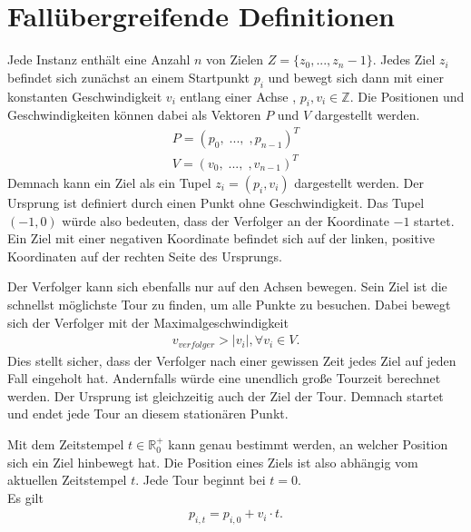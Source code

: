\documentclass[german,version-2019-11]{uzl-thesis}
\begin{document}
\section{Fallübergreifende Definitionen}
\begin{definition} 
\label{def:Ziel}
Jede Instanz enthält eine Anzahl $n$ von Zielen $Z = \{z_0,...,z_n-1\}$. Jedes Ziel $z_i$ befindet sich zunächst an einem Startpunkt $p_i$ und bewegt sich dann mit einer konstanten Geschwindigkeit $v_i$ entlang einer Achse , $p_i, v_i \in\mathbb{Z}$. Die Positionen und Geschwindigkeiten können dabei als Vektoren $P$ und $V$ dargestellt werden.
\begin{align*}
P = (p_0, \; ..., \; ,p_{n-1})^T \\
V = (v_0, \; ..., \; ,v_{n-1})^T
\end{align*}
Demnach kann ein Ziel als ein Tupel $z_i = (p_i, v_i)$ dargestellt werden. Der Ursprung ist definiert durch einen Punkt ohne Geschwindigkeit. Das Tupel $(-1,0)$ würde also bedeuten, dass der Verfolger an der Koordinate $-1$ startet. Ein Ziel mit einer negativen Koordinate befindet sich auf der linken, positive Koordinaten auf der rechten Seite des Ursprungs. 
\end{definition}

\begin{definition}
Der Verfolger kann sich ebenfalls nur auf den Achsen bewegen. Sein Ziel ist die schnellst möglichste Tour zu finden, um alle Punkte zu besuchen. Dabei bewegt sich der Verfolger mit der Maximalgeschwindigkeit 
\begin{align*}
v_{verfolger} > |v_i|, \forall v_i\in V.
\end{align*}
Dies stellt sicher, dass der Verfolger nach einer gewissen Zeit jedes Ziel auf jeden Fall eingeholt hat. Andernfalls würde eine unendlich große Tourzeit berechnet werden. Der Ursprung ist gleichzeitig auch der Ziel der Tour. Demnach startet und endet jede Tour an diesem stationären Punkt.
\end{definition}

\begin{definition}
\label{def:UpdatedPos}
Mit dem Zeitstempel $t\in \mathbb{R}^+_0$ kann genau bestimmt werden, an welcher Position sich ein Ziel hinbewegt hat. Die Position eines Ziels ist also abhängig vom aktuellen Zeitstempel $t$. Jede Tour beginnt bei $t=0$. \\
Es gilt
\begin{align*}
p_{i,t} = p_{i,0} + v_i\cdot t.
\end{align*} 
\end{definition}
\end{document}
